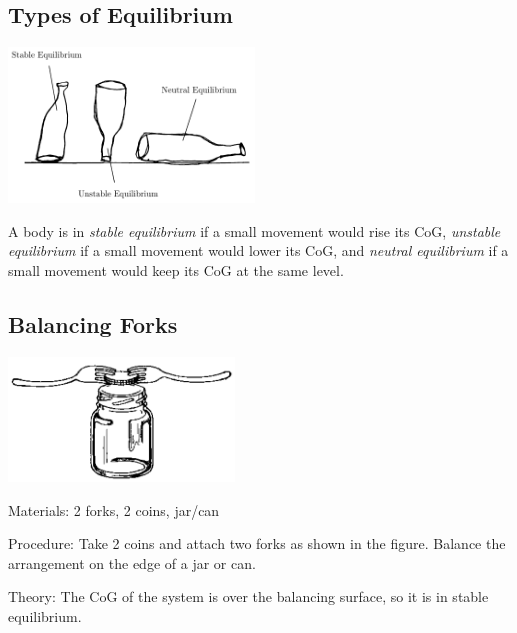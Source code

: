\begin{multicols}{2}

\section*{Types of Equilibrium}

\begin{center}
\includegraphics[width=0.49\textwidth]{./img/equilibrium.png}
\end{center}

A body is in \emph{stable equilibrium} if a small movement would rise its CoG, \emph{unstable equilibrium} if a small movement would lower its CoG, and \emph{neutral equilibrium} if a small movement would keep its CoG at the same level.

\subsection{Balancing Forks}

\begin{center}
\includegraphics[width=0.45\textwidth]{./img/source/forks.png}
\end{center}

\begin{description*}
\item[Materials:]{2 forks, 2 coins, jar/can}
\item[Procedure:]{Take 2 coins and attach two forks as shown in the figure. Balance the arrangement on the edge of a jar or can.}
\item[Theory:]{The CoG of the system is over the balancing surface, so it is in stable equilibrium.}
\end{description*}


\end{multicols}
